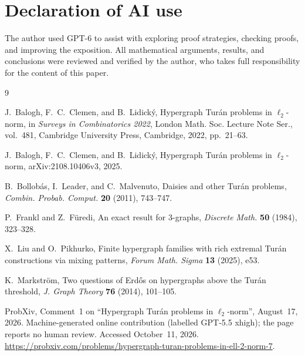 \documentclass[11pt]{article}
\theoremstyle{remark}
\numberwithin{equation}{section}
\begin{document}
\section*{Declaration of AI use}

The author used GPT-6 to assist with exploring proof strategies,
checking proofs, and improving the exposition. All mathematical
arguments, results, and conclusions were reviewed and verified by the
author, who takes full responsibility for the content of this paper.

\begin{thebibliography}{9}

J.~Balogh, F.~C.~Clemen, and B.~Lidick\'y,
Hypergraph Tur\'an problems in $\ell_2$-norm,
in \emph{Surveys in Combinatorics 2022},
London Math. Soc. Lecture Note Ser., vol.~481,
Cambridge University Press, Cambridge, 2022, pp.~21--63.

J.~Balogh, F.~C.~Clemen, and B.~Lidick\'y,
Hypergraph Tur\'an problems in $\ell_2$-norm,
arXiv:2108.10406v3,
2025.

B.~Bollob\'as, I.~Leader, and C.~Malvenuto,
Daisies and other Tur\'an problems,
\emph{Combin. Probab. Comput.} \textbf{20} (2011), 743--747.

P.~Frankl and Z.~F\"uredi,
An exact result for 3-graphs,
\emph{Discrete Math.} \textbf{50} (1984), 323--328.

X.~Liu and O.~Pikhurko,
Finite hypergraph families with rich extremal Tur\'an constructions via mixing patterns,
\emph{Forum Math. Sigma} \textbf{13} (2025), e53.

K.~Markstr\"om,
Two questions of Erd\H{o}s on hypergraphs above the Tur\'an threshold,
\emph{J. Graph Theory} \textbf{76} (2014), 101--105.

ProbXiv,
Comment~1 on ``Hypergraph Tur\'an problems in $\ell_2$-norm'',
August~17, 2026. Machine-generated online contribution
(labelled GPT-5.5 xhigh); the page reports no human review.
Accessed October~11, 2026.
\url{https://probxiv.com/problems/hypergraph-turan-problems-in-ell-2-norm-7}.

\end{thebibliography}
\end{document}

